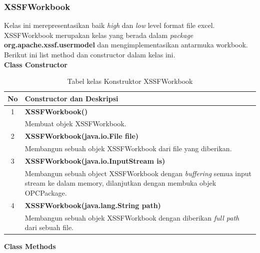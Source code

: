 \subsubsection{XSSFWorkbook}
\label{subs:XSSFWorkbook}
Kelas ini merepresentasikan baik \textit{high} dan \textit{low} level format file excel. XSSFWorkbook merupakan kelas yang berada dalam \textit{package} \textbf{org.apache.xssf.usermodel} dan mengimplementasikan antarmuka workbook. Berikut ini list method dan constructor dalam kelas ini.\cite{apachepoi2}
\\
\noindent \textbf{Class Constructor}
\begin{table}[H]
		\centering
		\caption{Tabel kelas Konstruktor XSSFWorkbook}
		\label{tab:konstrukXSSF}
	\begin{tabular}{|c|p{12cm}|}
		\hline
		\textbf{No} & \textbf{Constructor dan Deskripsi} \\ \hline \hline
		1 & \textbf{XSSFWorkbook()}\\
			&	Membuat objek XSSFWorkbook.\\ \hline 
		2 & \textbf{XSSFWorkbook(java.io.File file)}\\
			&	Membangun sebuah objek XSSFWorkbook dari file yang diberikan.\\ \hline
		3 & \textbf{XSSFWorkbook(java.io.InputStream is)}\\
			&	Membangun sebuah object XSSFWorkbook dengan \textit{buffering} semua input stream ke dalam memory, dilanjutkan dengan membuka objek OPCPackage.\\ \hline 
		4 & \textbf{XSSFWorkbook(java.lang.String path)}\\
			&	Membangun sebuah objek XSSFWorkbook dengan diberikan \textit{full path} dari sebuah file.\\ \hline
	\end{tabular}
\end{table}

\noindent \textbf{Class Methods}

